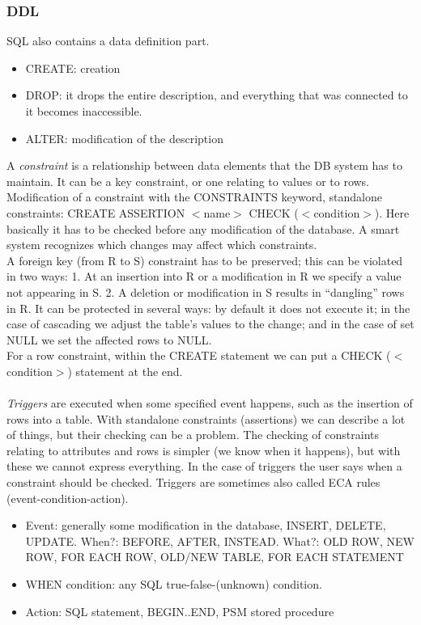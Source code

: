 \documentclass[margin=0px]{article}
\begin{document}
\subsubsection{DDL}

SQL also contains a data definition part.
\begin{itemize}
    \item CREATE: creation
    \item DROP: it drops the entire description, and everything that was connected to it becomes inaccessible.
    \item ALTER: modification of the description
\end{itemize}
A \textit{constraint} is a relationship between data elements that the DB system has to maintain. It can be a key constraint, or one relating to values or to rows. Modification of a constraint with the CONSTRAINTS keyword, standalone constraints: CREATE ASSERTION $<$name$>$ CHECK ($<$condition$>$). Here basically it has to be checked before any modification of the database. A smart system recognizes which changes may affect which constraints. \\
A foreign key (from R to S) constraint has to be preserved; this can be violated in two ways: 1. At an insertion into R or a modification in R we specify a value not appearing in S. 2. A deletion or modification in S results in ``dangling'' rows in R. It can be protected in several ways: by default it does not execute it; in the case of cascading we adjust the table's values to the change; and in the case of set NULL we set the affected rows to NULL. \\
For a row constraint, within the CREATE statement we can put a CHECK ($<$condition$>$) statement at the end. \\ \\
\textit{Triggers} are executed when some specified event happens, such as the insertion of rows into a table. With standalone constraints (assertions) we can describe a lot of things, but their checking can be a problem. The checking of constraints relating to attributes and rows is simpler (we know when it happens), but with these we cannot express everything. In the case of triggers the user says when a constraint should be checked. Triggers are sometimes also called ECA rules (event-condition-action).
\begin{itemize}
    \item Event: generally some modification in the database, INSERT, DELETE, UPDATE. When?: BEFORE, AFTER, INSTEAD. What?: OLD ROW, NEW ROW, FOR EACH ROW, OLD/NEW TABLE, FOR EACH STATEMENT
    \item WHEN condition: any SQL true-false-(unknown) condition.
    \item Action: SQL statement, BEGIN..END, PSM stored procedure
\end{itemize}
\end{document}
